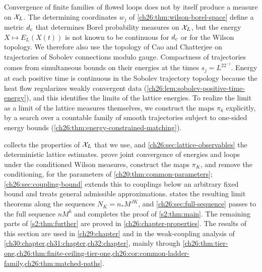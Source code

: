 Convergence of finite families of flowed loops does not by itself produce a measure on $\mathcal X_L$. The determining coordinates $w_j$ of \cref{ch26:thm:wilson-borel-space} define a metric $d_c$ that determines Borel probability measures on $\mathcal X_L$, but the energy $X\mapsto E_L(X(t))$ is not known to be continuous for $d_c$ or for the Wilson topology. We therefore also use the topology of Cao and Chatterjee on trajectories of Sobolev connections modulo gauge. Compactness of trajectories comes from simultaneous bounds on their energies at the times $s_j=L^22^{-j}$. Energy at each positive time is continuous in the Sobolev trajectory topology because the heat flow regularizes weakly convergent data (\cref{ch26:lem:sobolev-positive-time-energy}), and this identifies the limits of the lattice energies. To realize the limit as a limit of the lattice measures themselves, we construct the maps $\pi_k$ explicitly, by a search over a countable family of smooth trajectories subject to one-sided energy bounds (\cref{ch26:thm:energy-constrained-matching}).

 collects the properties of $\mathcal X_L$ that we use, and \cref{ch26:sec:lattice-observables} the deterministic lattice estimates.  prove joint convergence of energies and loops under the conditioned Wilson measures, construct the maps $\pi_K$, and remove the conditioning, for the parameters of \cref{ch20:thm:common-parameters}; \cref{ch26:sec:coupling-bound} extends this to couplings below an arbitrary fixed bound and treats general admissible approximations.  states the resulting limit theorems along the sequences $N_K=n_*M^{JK}$, and \cref{ch26:sec:full-sequence} passes to the full sequence $nM^k$ and completes the proof of \cref{s2:thm:main}. The remaining parts of \cref{s2:thm:further} are proved in \cref{ch26:chapter-properties}. The results of this section are used in \cref{ch29:chapter} and in the weak-coupling analysis of \cref{ch30:chapter,ch31:chapter,ch32:chapter}, mainly through \cref{ch26:thm:tier-one,ch26:thm:finite-ceiling-tier-one,ch26:cor:common-ladder-family,ch26:thm:matched-paths}.

